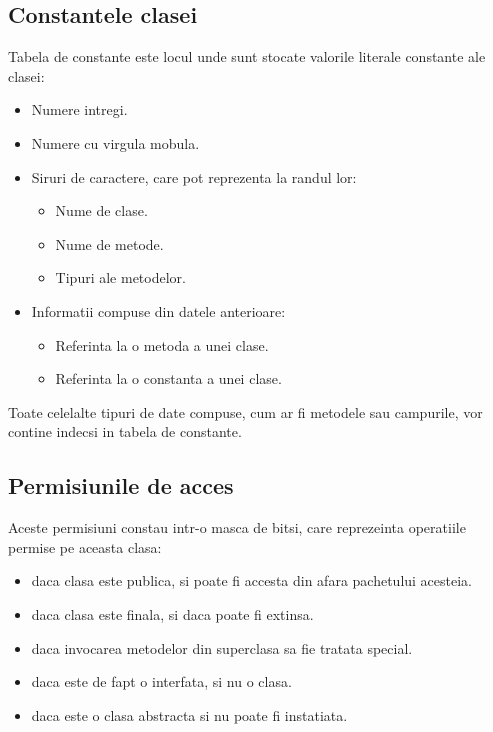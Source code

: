 \subsection{Constantele clasei}

Tabela de constante este locul unde sunt stocate valorile literale
constante ale clasei:

\begin{itemize}
    \item Numere intregi.
    \item Numere cu virgula mobula.
    \item Siruri de caractere, care pot reprezenta la randul lor:
        \begin{itemize}
            \item Nume de clase.
            \item Nume de metode.
            \item Tipuri ale metodelor.
        \end{itemize}
    \item Informatii compuse din datele anterioare:
        \begin{itemize}
            \item Referinta la o metoda a unei clase.
            \item Referinta la o constanta a unei clase.
        \end{itemize}
\end{itemize}

Toate celelalte tipuri de date compuse, cum ar fi metodele sau
campurile, vor contine indecsi in tabela de constante.

\subsection{Permisiunile de acces}

Aceste permisiuni constau intr-o masca de bitsi, care reprezeinta
operatiile permise pe aceasta clasa:

\begin{itemize}
    \item daca clasa este publica, si poate fi accesta din afara pachetului acesteia.
    \item daca clasa este finala, si daca poate fi extinsa.
    \item daca invocarea metodelor din superclasa sa fie tratata special.
    \item daca este de fapt o interfata, si nu o clasa.
    \item daca este o clasa abstracta si nu poate fi instatiata.
\end{itemize}

